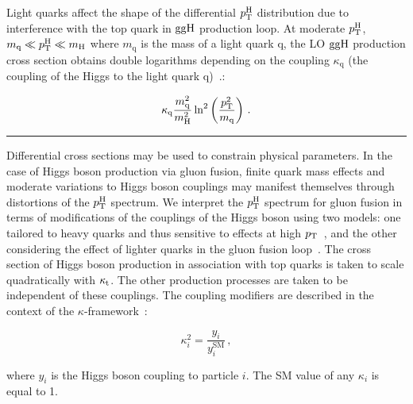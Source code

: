 Light quarks affect the shape of the differential $p_\mathrm{T}^\mathrm{H}$ distribution due to interference with the top quark in $\mathrm{g}\mathrm{g}\mathrm{H}$ production loop.
% 
At moderate $p_\mathrm{T}^\mathrm{H}$, $m_\mathrm{q} \ll p_\mathrm{T}^\mathrm{H} \ll m_{\mathrm{H}}$ where $m_\mathrm{q}$ is the mass of a light quark $\mathrm{q}$, the LO $\mathrm{g}\mathrm{g}\mathrm{H}$ production cross section obtains double logarithms depending on the coupling $\kappa_\mathrm{q}$ (the coupling of the Higgs to the light quark $\mathrm{q}$)~\cite{Baur:1989cm}.:
% 
\begin{linenomath*}
\begin{equation}
\kappa_\mathrm{q} \frac{m_\mathrm{q}^2}{m_{\mathrm{H}}^2}
    \ln^2 \left(
        \frac{p_\mathrm{T}^2}{m_\mathrm{q}}
        \right)
\,.
\end{equation}
\end{linenomath*}
% 
% 







\vspace{1cm}
\hrule
{}

Differential cross sections may be used to constrain physical parameters.
% 
In the case of Higgs boson production via gluon fusion, finite quark mass effects and moderate variations to Higgs boson couplings may manifest themselves through distortions of the $p_\mathrm{T}^\mathrm{H}$ spectrum.
% 
We interpret the $p_\mathrm{T}^\mathrm{H}$ spectrum for gluon fusion in terms of modifications of the couplings of the Higgs boson using two models: one tailored to heavy quarks and thus sensitive to effects at high $p_\mathrm{T}$~\cite{Grazzini:2017szg,Grazzini:2016paz}, and the other considering the effect of lighter quarks in the gluon fusion loop~\cite{Bishara:2016jga}.
% 
The cross section of Higgs boson production in association with top quarks is taken to scale quadratically with $\kappa_{\mathrm{t}}$.
% 
The other production processes are taken to be independent of these couplings.
% 
The coupling modifiers are described in the context of the $\kappa$-framework~\cite{LHCHXSWG:YR3}:
% 
\begin{linenomath*}
\begin{equation}
\kappa_{i}^{2} = \frac{y_{i}}{y_{i}^{\text{SM}}}\,,
\end{equation}
\end{linenomath*}
% 
where $y_i$ is the Higgs boson coupling to particle $i$.
% 
The SM value of any $\kappa_i$ is equal to 1.


